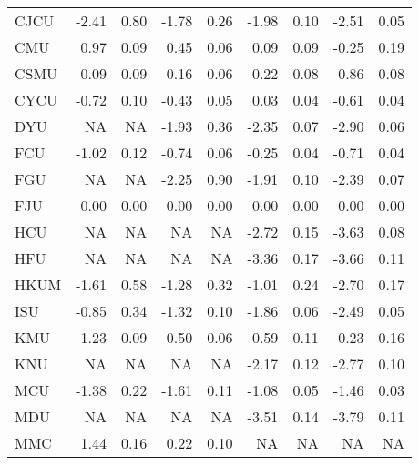 \begin{longtable}[t]{lrrrrrrrr}
\hspace{1em}CJCU & -2.41 & 0.80 & -1.78 & 0.26 & -1.98 & 0.10 & -2.51 & 0.05\\
\hspace{1em}CMU & 0.97 & 0.09 & 0.45 & 0.06 & 0.09 & 0.09 & -0.25 & 0.19\\
\hspace{1em}CSMU & 0.09 & 0.09 & -0.16 & 0.06 & -0.22 & 0.08 & -0.86 & 0.08\\
\hspace{1em}CYCU & -0.72 & 0.10 & -0.43 & 0.05 & 0.03 & 0.04 & -0.61 & 0.04\\
\hspace{1em}DYU & NA & NA & -1.93 & 0.36 & -2.35 & 0.07 & -2.90 & 0.06\\
\hspace{1em}FCU & -1.02 & 0.12 & -0.74 & 0.06 & -0.25 & 0.04 & -0.71 & 0.04\\
\hspace{1em}FGU & NA & NA & -2.25 & 0.90 & -1.91 & 0.10 & -2.39 & 0.07\\
\hspace{1em}FJU & 0.00 & 0.00 & 0.00 & 0.00 & 0.00 & 0.00 & 0.00 & 0.00\\
\hspace{1em}HCU & NA & NA & NA & NA & -2.72 & 0.15 & -3.63 & 0.08\\
\hspace{1em}HFU & NA & NA & NA & NA & -3.36 & 0.17 & -3.66 & 0.11\\
\hspace{1em}HKUM & -1.61 & 0.58 & -1.28 & 0.32 & -1.01 & 0.24 & -2.70 & 0.17\\
\hspace{1em}ISU & -0.85 & 0.34 & -1.32 & 0.10 & -1.86 & 0.06 & -2.49 & 0.05\\
\hspace{1em}KMU & 1.23 & 0.09 & 0.50 & 0.06 & 0.59 & 0.11 & 0.23 & 0.16\\
\hspace{1em}KNU & NA & NA & NA & NA & -2.17 & 0.12 & -2.77 & 0.10\\
\hspace{1em}MCU & -1.38 & 0.22 & -1.61 & 0.11 & -1.08 & 0.05 & -1.46 & 0.03\\
\hspace{1em}MDU & NA & NA & NA & NA & -3.51 & 0.14 & -3.79 & 0.11\\
\hspace{1em}MMC & 1.44 & 0.16 & 0.22 & 0.10 & NA & NA & NA & NA\\

\end{longtable}
